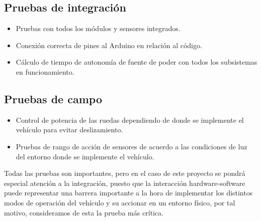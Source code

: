 \subsection{Pruebas de integración}
\begin{itemize}
    \item Pruebas con todos los módulos y sensores integrados.
    \item Conexión correcta de pines al Arduino en relación al código.
    \item Cálculo de tiempo de autonomía de fuente de poder con todos los subsistemas en funcionamiento.
\end{itemize}

\subsection{Pruebas de campo}
\begin{itemize}
    \item Control de potencia de las ruedas dependiendo de donde se implemente el vehículo para evitar deslizamiento.
    \item Pruebas de rango de acción de sensores de acuerdo a las condiciones de luz del entorno donde se implemente el vehículo.
\end{itemize}

Todas las pruebas son importantes, pero en el caso de este proyecto se pondrá especial atención a la integración, puesto que la interacción hardware-software puede representar una barrera importante a la hora de implementar los distintos modos de operación del vehículo y su accionar en un entorno físico, por tal motivo, consideramos de esta la prueba más crítica.